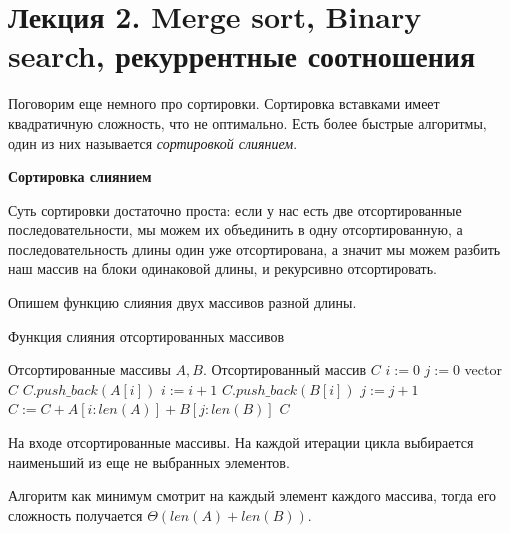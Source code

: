 \documentclass[../main.tex]{subfiles}
\begin{document}
	\section{Лекция 2. Merge sort, Binary search, рекуррентные соотношения}
	
	Поговорим еще немного про сортировки. Сортировка вставками имеет квадратичную сложность, что не оптимально. Есть более быстрые алгоритмы, один из них называется \textit{сортировкой слиянием}.
	
	\textbf{Сортировка слиянием}
	
	Суть сортировки достаточно проста: если у нас есть две отсортированные последовательности, мы можем их объединить в одну отсортированную, а последовательность длины один уже отсортирована, а значит мы можем разбить наш массив на блоки одинаковой длины, и рекурсивно отсортировать.
	
	
	Опишем функцию слияния двух массивов разной длины.
	\begin{algorithm}[H]
		\caption{Функция слияния отсортированных массивов}
		\begin{algorithmic}[1]
			\Require Отсортированные массивы $A, B$.
			\Ensure Отсортированный массив $C$
				\State $ i := 0 $
				\State $ j := 0 $
				\State vector $C$
						\State $C.push\_back(A[i])$
						\State $i := i + 1$
					\Else
						\State $C.push\_back(B[i])$
						\State $j := j + 1$
					\EndIf
				\EndWhile
				\State $ C := C + A[i:len(A)] + B[j:len(B)]$
				\State \Return $C$
			\EndFunction
		\end{algorithmic}
	\end{algorithm}

		
	\begin{proof_cor}
		На входе отсортированные массивы. На каждой итерации цикла выбирается наименьший из еще не выбранных элементов.
	\end{proof_cor}
	\begin{time}
		Алгоритм как минимум смотрит на каждый элемент каждого массива, тогда его сложность получается $\Theta(len(A) + len(B))$.
	\end{time}	
\end{document}
